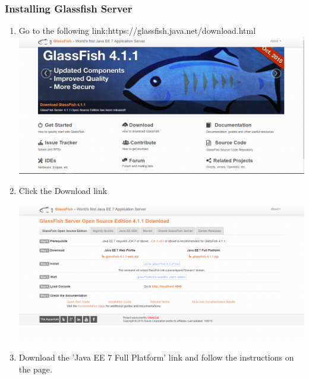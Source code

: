 \documentclass[a4paper,12pt]{article}
\begin{document}
\subsubsection{Installing Glassfish Server}
\begin{enumerate}
\item Go to the following link:https://glassfish.java.net/download.html\\[0.2cm]
\includegraphics[width=0.9\linewidth, center]{./Installation/glassfish_download_1.PNG}\\[0.4cm]
\item Click the Download link

\includegraphics[width=0.9\linewidth, center]{./Installation/glassfish_download_2.PNG}\\[0.4cm]

\item Download  the 'Java EE 7 Full Platform' link and follow the instructions on the page.
\end{enumerate}
\end{document}
